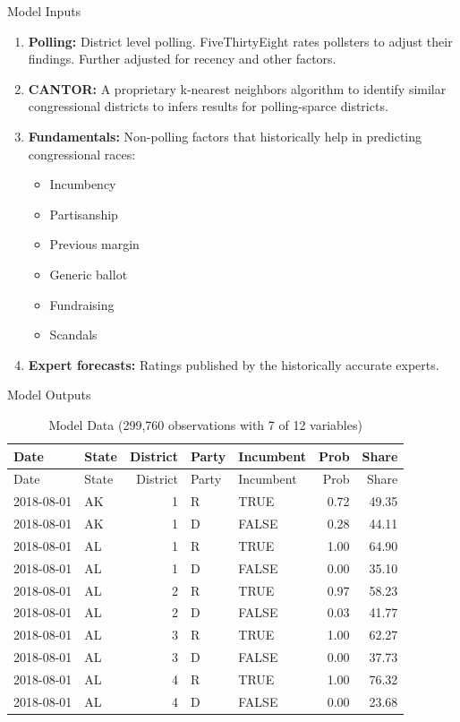 \documentclass[ignorenonframetext,]{beamer}
\providecommand{\tightlist}{%
  \setlength{\itemsep}{0pt}\setlength{\parskip}{0pt}}
\begin{document}
\begin{frame}{Model Inputs}
\protect\hypertarget{model-inputs}{}

\begin{enumerate}
\tightlist
\item
  \textbf{Polling:} District level polling. FiveThirtyEight rates
  pollsters to adjust their findings. Further adjusted for recency and
  other factors.
\item
  \textbf{CANTOR:} A proprietary k-nearest neighbors algorithm to
  identify similar congressional districts to infers results for
  polling-sparce districts.
\item
  \textbf{Fundamentals:} Non-polling factors that historically help in
  predicting congressional races:

  \begin{itemize}
  \tightlist
  \item
    Incumbency
  \item
    Partisanship
  \item
    Previous margin
  \item
    Generic ballot
  \item
    Fundraising
  \item
    Scandals
  \end{itemize}
\item
  \textbf{Expert forecasts:} Ratings published by the historically
  accurate experts.
\end{enumerate}

\end{frame}

\begin{frame}{Model Outputs}
\protect\hypertarget{model-outputs}{}

\begin{longtable}[]{@{}llrllrr@{}}
\caption{Model Data (299,760 observations with 7 of 12
variables)}\tabularnewline
\toprule
Date & State & District & Party & Incumbent & Prob &
Share\tabularnewline
\midrule
\endfirsthead
\toprule
Date & State & District & Party & Incumbent & Prob &
Share\tabularnewline
\midrule
\endhead
2018-08-01 & AK & 1 & R & TRUE & 0.72 & 49.35\tabularnewline
2018-08-01 & AK & 1 & D & FALSE & 0.28 & 44.11\tabularnewline
2018-08-01 & AL & 1 & R & TRUE & 1.00 & 64.90\tabularnewline
2018-08-01 & AL & 1 & D & FALSE & 0.00 & 35.10\tabularnewline
2018-08-01 & AL & 2 & R & TRUE & 0.97 & 58.23\tabularnewline
2018-08-01 & AL & 2 & D & FALSE & 0.03 & 41.77\tabularnewline
2018-08-01 & AL & 3 & R & TRUE & 1.00 & 62.27\tabularnewline
2018-08-01 & AL & 3 & D & FALSE & 0.00 & 37.73\tabularnewline
2018-08-01 & AL & 4 & R & TRUE & 1.00 & 76.32\tabularnewline
2018-08-01 & AL & 4 & D & FALSE & 0.00 & 23.68\tabularnewline
\bottomrule
\end{longtable}

\end{frame}
\end{document}
